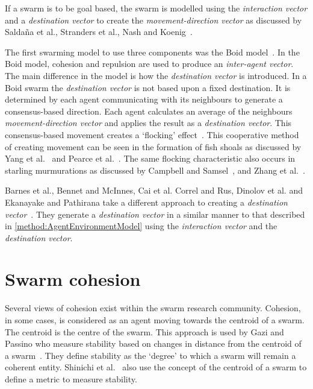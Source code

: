 If a swarm is to be goal based, the swarm is modelled using the \textit{interaction vector} and a \textit{destination vector} to create the \textit{movement-direction vector} as discussed by Salda\~na et al., Stranders et al., Nash and Koenig~\cite{SOM:12, SRDF:10, NK:10}. 

The first swarming model to use three components was the Boid model~\cite{REY:87}. In the Boid model, cohesion and repulsion are used to produce an \textit{inter-agent vector}. The main difference in the model is how the \textit{destination vector} is introduced. In a Boid swarm the \textit{destination vector} is not based upon a fixed destination. It is determined by each agent communicating with its neighbours to generate a consensus-based direction. Each agent calculates an average of the neighbours \textit{movement-direction vector} and applies the result as a \textit{destination vector}. This consensus-based movement creates a `flocking' effect~\cite{KC:08, REY:87}. This cooperative method of creating movement can be seen in the formation of fish shoals as discussed by Yang et al.~\cite{YGT:10} and Pearce et al.~\cite{PMRT:14}. The same flocking characteristic also occurs in starling murmurations as discussed by Campbell and Samsel~\cite{CS:15}, and Zhang et al.~\cite{ZZLW:14}. 

Barnes et al., Bennet and McInnes, Cai et al. Correl and Rus, Dinolov et al. and Ekanayake and Pathirana take a different approach to creating a \textit{destination vector}~\cite{BAF:06, BAFVM:06, BM:09, CML:ND, CR:13, DLK:11, EP:10}. They generate a \textit{destination vector} in a similar manner to that described in \autoref{method:AgentEnvironmentModel} using the \textit{interaction vector} and the \textit{destination vector}.

\section{Swarm cohesion}\label{sec:Cohesion1}
Several views of cohesion exist within the swarm research community. Cohesion, in some cases, is considered as an agent moving towards the centroid of a swarm. The centroid is the centre of the swarm. This approach is used by Gazi and Passino who measure stability based on changes in distance from the centroid of a swarm~\cite{GP:11, GP:04}. They define stability as the `degree' to which a swarm will remain a coherent entity. Shinichi et al.~\cite{AYSH:08} also use the concept of the centroid of a swarm to define a metric to measure stability.

